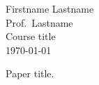 \documentclass[12pt,letterpaper]{article}
\begin{document}
\begin{flushleft}

Firstname Lastname\\ %
Prof.\ Lastname \\ %
Course title \\ %
\today

\begin{center}
Paper title.
\end{center}

\setlength{\parindent}{0.5in}



\nocite{*}

\end{flushleft}

\newpage
\printbibliography{}
\end{document}
